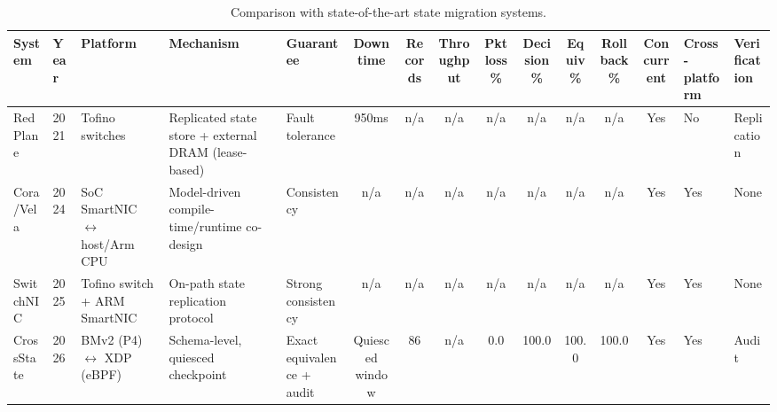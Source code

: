 \begin{table}[!t]
\centering
\footnotesize
\setlength{\tabcolsep}{3.5pt}
\renewcommand{\arraystretch}{1.15}
\caption{Comparison with state-of-the-art state migration systems.}
\label{tab:sota}
\begin{tabular}{@{}lllp{2.6cm}p{2.2cm}cccccccc@{}}
\toprule
\textbf{System} & \textbf{Year} & \textbf{Platform} & \textbf{Mechanism} & \textbf{Guarantee} & \textbf{Downtime} & \textbf{Records} & \textbf{Throughput} & \textbf{Pkt loss\%} & \textbf{Decision\%} & \textbf{Equiv\%} & \textbf{Rollback\%} & \textbf{Concurrent} & \textbf{Cross-platform} & \textbf{Verification} \\
\midrule
RedPlane & 2021 & Tofino switches & Replicated state store + external DRAM (lease-based) & Fault tolerance & 950ms & n/a & n/a & n/a & n/a & n/a & n/a & Yes & No & Replication \\
Cora/Vela & 2024 & SoC SmartNIC $\leftrightarrow$ host/Arm CPU & Model-driven compile-time/runtime co-design & Consistency & n/a & n/a & n/a & n/a & n/a & n/a & n/a & Yes & Yes & None \\
SwitchNIC & 2025 & Tofino switch + ARM SmartNIC & On-path state replication protocol & Strong consistency & n/a & n/a & n/a & n/a & n/a & n/a & n/a & Yes & Yes & None \\
CrossState & 2026 & BMv2 (P4) $\leftrightarrow$ XDP (eBPF) & Schema-level, quiesced checkpoint & Exact equivalence + audit & Quiesced window & 86 & n/a & 0.0 & 100.0 & 100.0 & 100.0 & Yes & Yes & Audit \\
\bottomrule
\end{tabular}
\end{table}